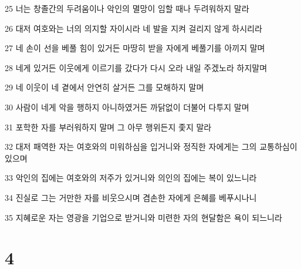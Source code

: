 \par 25 너는 창졸간의 두려움이나 악인의 멸망이 임할 때나 두려워하지 말라
\par 26 대저 여호와는 너의 의지할 자이시라 네 발을 지켜 걸리지 않게 하시리라
\par 27 네 손이 선을 베풀 힘이 있거든 마땅히 받을 자에게 베풀기를 아끼지 말며
\par 28 네게 있거든 이웃에게 이르기를 갔다가 다시 오라 내일 주겠노라 하지말며
\par 29 네 이웃이 네 곁에서 안연히 살거든 그를 모해하지 말며
\par 30 사람이 네게 악을 행하지 아니하였거든 까닭없이 더불어 다투지 말며
\par 31 포학한 자를 부러워하지 말며 그 아무 행위든지 좇지 말라
\par 32 대저 패역한 자는 여호와의 미워하심을 입거니와 정직한 자에게는 그의 교통하심이 있으며
\par 33 악인의 집에는 여호와의 저주가 있거니와 의인의 집에는 복이 있느니라
\par 34 진실로 그는 거만한 자를 비웃으시며 겸손한 자에게 은혜를 베푸시나니
\par 35 지혜로운 자는 영광을 기업으로 받거니와 미련한 자의 현달함은 욕이 되느니라

\chapter{4}

